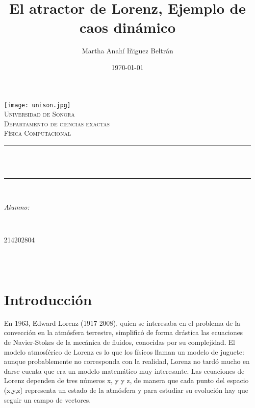\documentclass[12pt]{article}
\title{El atractor de Lorenz, Ejemplo de caos dinámico}								%
\author{Martha Anahí Iñiguez Beltrán}						%
\date{\today}											%
\makeatletter
\let\thetitle\@title
\let\theauthor\@author
\let\thedate\@date
\makeatother
\begin{document}
\begin{titlepage}
\centering
    \vspace*{0.5 cm}
    \texttt{[image: unison.jpg]}\\[1.0 cm]	%
    \textsc{\LARGE Universidad de Sonora}\\[2.0 cm]	%
    \textsc{\Large Departamento de ciencias exactas}\\[1.0 cm]
\textsc{\Large Física Computacional}\\[0.5 cm]
\rule{\linewidth}{0.2 mm} \\[0.4 cm]
{ \huge \bfseries \thetitle}\\
\rule{\linewidth}{0.2 mm} \\[1.5 cm]
\begin{minipage}{0.6\textwidth}
\begin{flushleft} \large
\emph{Alumno:}\\
\theauthor
\end{flushleft}
\end{minipage}~
\begin{minipage}{0.4\textwidth}
\begin{flushright} \large
214202804
\end{flushright}
\end{minipage}\\[2 cm]


{\large \thedate}\\[2 cm]

\vfill

\end{titlepage}

\tableofcontents
\pagebreak


\section{Introducción}
\noindent

En 1963, Edward Lorenz (1917-2008), quien se interesaba en el problema de la convección en la atmósfera terrestre, simplificó de forma drástica las ecuaciones de Navier-Stokes de la mecánica de fluidos, conocidas por su complejidad. El modelo atmosférico de Lorenz es lo que los físicos llaman un modelo de juguete: aunque probablemente no corresponda con la realidad, Lorenz no tardó mucho en darse cuenta que era un modelo matemático muy interesante. Las ecuaciones de Lorenz dependen de tres números x, y y z, de manera que cada punto del espacio (x,y,z) representa un estado de la atmósfera y para estudiar su evolución hay que seguir un campo de vectores.
\end{document}
